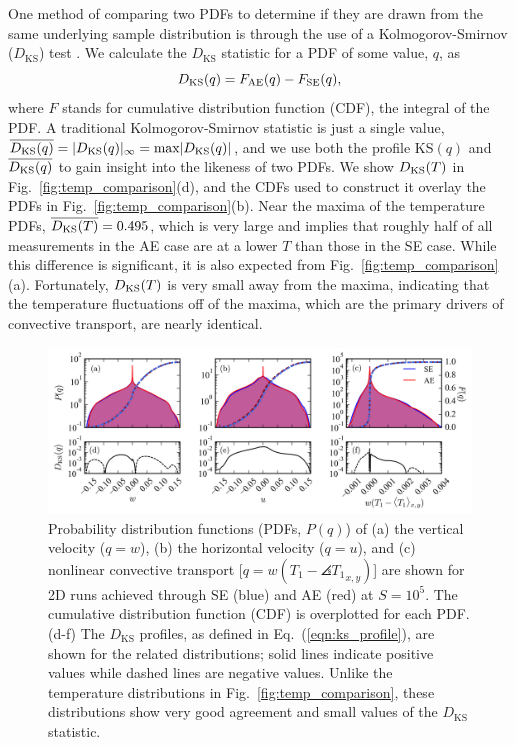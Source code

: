 One method of comparing two
PDFs to determine if they are drawn from the same underlying
sample distribution is through the use of a Kolmogorov-Smirnov ($D_{\text{KS}}$) test \cite{wall&jenkins2012}.
We calculate the $D_{\text{KS}}$ statistic for a PDF of some value, $q$, as
\begin{equation}
D_{\text{KS}}(q) = F_{\text{AE}}(q) - F_{\text{SE}}(q),
\label{eqn:ks_profile}
\end{equation}
where $F$ stands for cumulative distribution function (CDF), the integral of the PDF.
A traditional Kolmogorov-Smirnov statistic is just a single value,
$\overline{D_\text{KS}(q)} = |D_{\text{KS}}(q)|_\infty =
\text{max} |D_{\text{KS}}(q)|$, and we use both the profile KS$(q)$ and
$\overline{D_\text{KS}(q)}$ to gain insight into the likeness of two PDFs. 
We show $D_{\text{KS}}(T)$ in Fig.~\ref{fig:temp_comparison}(d), and the
CDFs used to construct it overlay the PDFs in Fig.~\ref{fig:temp_comparison}(b).
Near the maxima of the temperature PDFs, $\overline{D_\text{KS}(T)} = 0.495$, 
which is very large and implies that roughly half of all
measurements in the AE case are at a lower $T$ than those in the SE case.
While this difference is significant, it is also expected from Fig.~\ref{fig:temp_comparison}(a).
Fortunately, $D_{\text{KS}}(T)$ is very small away from the maxima, 
indicating that the temperature fluctuations off of the maxima, which are the primary
drivers of convective transport, are nearly identical.


\begin{figure}[bt!]
\includegraphics[width=\textwidth]{./figs/pdf_comparison.png}
\caption{Probability distribution functions (PDFs, $P(q)$) of (a) the vertical velocity ($q = w$), (b) the horizontal velocity ($q = u$), and (c) nonlinear
convective transport [$q = w(T_1 - \angles{T_1}_{x,y})$] are shown for 2D runs achieved through SE (blue) and AE (red)
at $S = 10^{5}$.  The cumulative distribution function (CDF) is overplotted for each PDF. 
(d-f) The $D_{\text{KS}}$ profiles, as defined in Eq.~(\ref{eqn:ks_profile}),
are shown for the related distributions; solid lines indicate positive values
while dashed lines are negative values. Unlike the temperature distributions in
Fig.~\ref{fig:temp_comparison}, these distributions
show very good agreement and small values of the $D_{\text{KS}}$ statistic.
\label{fig:pdf_comparison} }
\end{figure}

